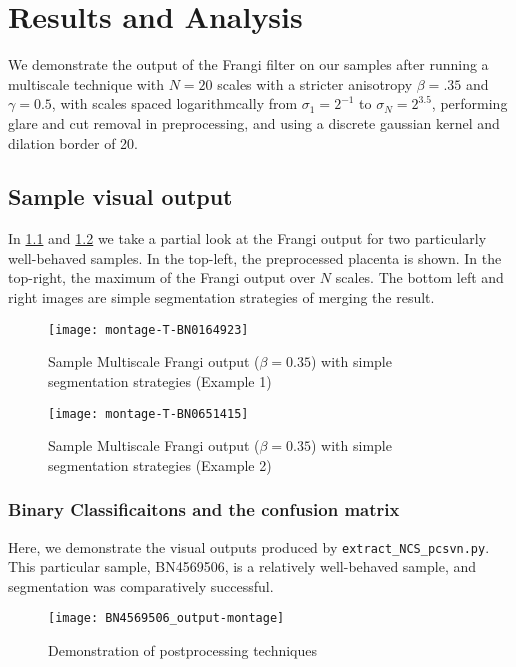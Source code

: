 \chapter{Results and Analysis} \label{ch:results-analysis}

We demonstrate the output of the Frangi filter on our samples after running a multiscale technique with $N=20$ scales with a stricter anisotropy $\beta = .35$ and $\gamma=0.5$,
with scales spaced logarithmcally from $\sigma_1 = 2^{-1}$ to $\sigma_N = 2^{3.5}$, performing glare and cut removal in preprocessing, and using a discrete gaussian kernel and dilation border of 20.

\section{Sample visual output}
In \cref{fig:output-montage-example1} and \cref{fig:output-montage-example2} we take a partial look at the Frangi output for two particularly well-behaved samples. In the top-left, the preprocessed placenta is shown. In the top-right, the maximum of the Frangi output over $N$ scales. The bottom left and right images are simple segmentation strategies of merging the result.

\begin{figure} \centering
  \texttt{[image: montage-T-BN0164923]}
  \caption{Sample Multiscale Frangi output ($\beta=0.35$) with simple segmentation strategies (Example 1)}
  \label{fig:output-montage-example1}
\end{figure}

\begin{figure} \centering
  \texttt{[image: montage-T-BN0651415]}
  \caption{Sample Multiscale Frangi output ($\beta=0.35$) with simple segmentation strategies (Example 2)}
  \label{fig:output-montage-example2}
\end{figure}


\subsection{Binary Classificaitons and the confusion matrix}

Here, we demonstrate the visual outputs produced by \texttt{extract\_NCS\_pcsvn.py}. This particular sample, BN4569506, is a relatively well-behaved sample, and segmentation was comparatively successful.

\begin{figure}
\centering
\texttt{[image: BN4569506\_output-montage]}
\caption{Demonstration of postprocessing techniques}
  \end{figure}

